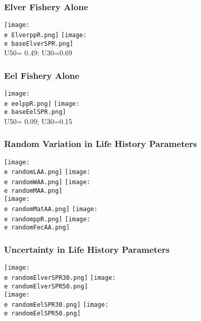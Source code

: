 \documentclass{beamer}
\newcommand{\e}{/SpinDr/backup/bio_data/bio.eels/figures/}
\begin{document}



\begin{frame}
	\frametitle{Elver Fishery Alone}
	  \texttt{[image: \\e ElverppR.png]}
	\centering
	  \texttt{[image: \\e baseElverSPR.png]}\\[-1ex]
	{\tiny{ U50= 0.49; U30=0.69}}


\end{frame}




\begin{frame}
	\frametitle{Eel Fishery Alone}
	
	  \texttt{[image: \\e eelppR.png]}
	\centering
	  \texttt{[image: \\e baseEelSPR.png]}\\[-1ex]
	{\tiny{ U50= 0.09; U30=0.15}}


\end{frame}



\begin{frame}
	\frametitle{Random Variation in Life History Parameters}
	\centering
	  \texttt{[image: \\e randomLAA.png]}
      \texttt{[image: \\e randomWAA.png]}
 	  \texttt{[image: \\e randomMAA.png]} \\
	  \texttt{[image: \\e randomMatAA.png]}
 	  \texttt{[image: \\e randomppR.png]}
	  \texttt{[image: \\e randomFecAA.png]}\\[-1ex]
	\end{frame}




\begin{frame}
	\frametitle{Uncertainty in Life History Parameters}
	\centering
	  \texttt{[image: \\e randomElverSPR30.png]}
	  \texttt{[image: \\e randomElverSPR50.png]}\\
	  \texttt{[image: \\e randomEelSPR30.png]}	
	  \texttt{[image: \\e randomEelSPR50.png]}



\end{frame}
\end{document}
